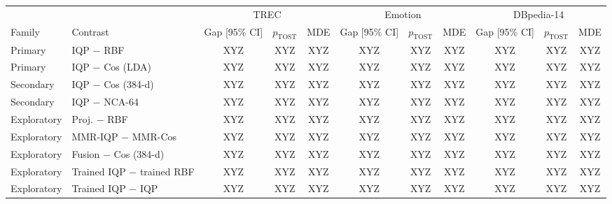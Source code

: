 \begin{tabular}{@{}ll ccc ccc ccc@{}}
\toprule
 & & \multicolumn{3}{c}{TREC} & \multicolumn{3}{c}{Emotion} & \multicolumn{3}{c}{DBpedia-14} \\
\cmidrule(lr){3-5}\cmidrule(lr){6-8}\cmidrule(lr){9-11}
Family & Contrast & Gap [95\% CI] & $p_\mathrm{TOST}$ & MDE & Gap [95\% CI] & $p_\mathrm{TOST}$ & MDE & Gap [95\% CI] & $p_\mathrm{TOST}$ & MDE \\
\midrule
Primary & IQP $-$ RBF & XYZ & XYZ & XYZ & XYZ & XYZ & XYZ & XYZ & XYZ & XYZ \\
Primary & IQP $-$ Cos (LDA) & XYZ & XYZ & XYZ & XYZ & XYZ & XYZ & XYZ & XYZ & XYZ \\
\midrule
Secondary & IQP $-$ Cos (384-d) & XYZ & XYZ & XYZ & XYZ & XYZ & XYZ & XYZ & XYZ & XYZ \\
Secondary & IQP $-$ NCA-64 & XYZ & XYZ & XYZ & XYZ & XYZ & XYZ & XYZ & XYZ & XYZ \\
\midrule
Exploratory & Proj. $-$ RBF & XYZ & XYZ & XYZ & XYZ & XYZ & XYZ & XYZ & XYZ & XYZ \\
Exploratory & MMR-IQP $-$ MMR-Cos & XYZ & XYZ & XYZ & XYZ & XYZ & XYZ & XYZ & XYZ & XYZ \\
Exploratory & Fusion $-$ Cos (384-d) & XYZ & XYZ & XYZ & XYZ & XYZ & XYZ & XYZ & XYZ & XYZ \\
Exploratory & Trained IQP $-$ trained RBF & XYZ & XYZ & XYZ & XYZ & XYZ & XYZ & XYZ & XYZ & XYZ \\
Exploratory & Trained IQP $-$ IQP & XYZ & XYZ & XYZ & XYZ & XYZ & XYZ & XYZ & XYZ & XYZ \\
\bottomrule
\end{tabular}
